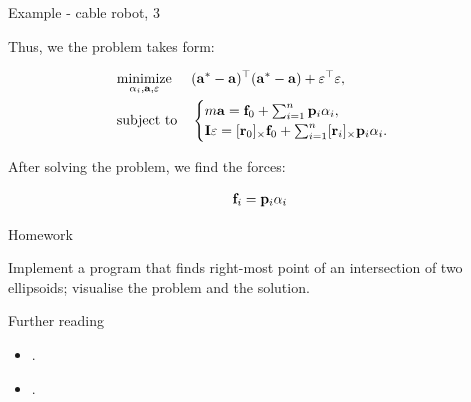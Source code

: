\documentclass{beamer}
\begin{document}
\begin{frame}{Example - cable robot, 3}
	\begin{flushleft}
		
		Thus, we the problem takes form:
		
		\begin{equation}
			\begin{aligned}
				& \underset{\alpha_i, \mathbf{a}, \varepsilon}{\text{minimize}}
				& & (\mathbf{a}^* - \mathbf{a})^\top (\mathbf{a}^* - \mathbf{a}) + \varepsilon^\top \varepsilon, 
				\\
				& \text{subject to}
				& & \begin{cases}
					m \mathbf{a} = \mathbf{f}_0 + \sum_{i = 1}^{n} \mathbf{p}_i \alpha_i,
					\\
					\mathbf{I} \varepsilon = [\mathbf{r}_0]_\times \mathbf{f}_0 + \sum_{i = 1}^{n} [\mathbf{r}_i]_\times \mathbf{p}_i \alpha_i.
				\end{cases}
			\end{aligned}
		\end{equation}
		
		\bigskip
		
		After solving the problem, we find the forces:
		
		\begin{align}
			 \mathbf{f}_i  = \mathbf{p}_i \alpha_i
		\end{align}
		
	\end{flushleft}
\end{frame}





\begin{frame}{Homework}
\begin{flushleft}

Implement a program that finds right-most point of an intersection of two ellipsoids; visualise the problem and the solution.

\end{flushleft}
\end{frame}



\begin{frame}{Further reading}
	\begin{flushleft}
		
		\begin{itemize}
			\item {}.
			
			\item {}.
			
			
		\end{itemize}
		
		
	\end{flushleft}
\end{frame}


\myqrframe
\end{document}
